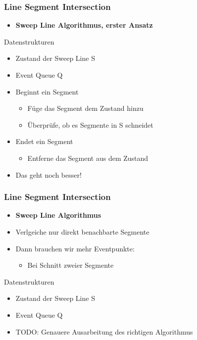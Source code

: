 \begin{frame}
	\frametitle{{Line Segment Intersection}}
	\begin{itemize}
		\item \textbf{Sweep Line Algorithmus, erster Ansatz}
		\pause
	\end{itemize}
	\begin{block}{Datenstrukturen}
		\begin{itemize}
			\item Zustand der Sweep Line S
			\pause
			\item Event Queue Q
		\end{itemize}
	\end{block}
	\begin{itemize}
		\pause
		\item Beginnt ein Segment
		\begin{itemize}
			\pause		
			\item F\"uge das Segment dem Zustand hinzu
			\pause
			\item \"Uberpr\"ufe, ob es Segmente in S schneidet
		\end{itemize}
		\pause
		\item Endet ein Segment
		\begin{itemize}
			\pause
			\item Entferne das Segment aus dem Zustand
		\end{itemize}
		\pause
		\item Das geht noch besser!
	\end{itemize}
\end{frame}
\begin{frame}
	\frametitle{{Line Segment Intersection}}
	\begin{itemize}
		\item \textbf{Sweep Line Algorithmus}
		\pause
		\item Verlgeiche nur direkt benachbarte Segmente
		\pause
		\item Dann brauchen wir mehr Eventpunkte:
		\begin{itemize}
			\pause
			\item Bei Schnitt zweier Segmente
		\end{itemize}
	\end{itemize}
	\pause
	\begin{block}{Datenstrukturen}
		\begin{itemize}
			\item Zustand der Sweep Line S 
			\pause
			\item Event Queue Q
		\end{itemize}
	\end{block}
	\begin{itemize}
		\pause
		\item TODO: Genauere Ausarbeitung des richtigen Algorithmus
	\end{itemize}
\end{frame}

